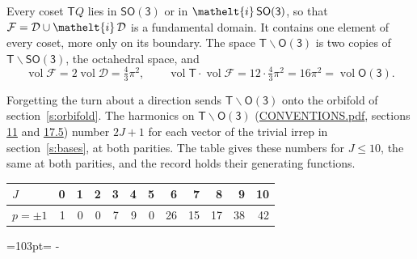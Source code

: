 \documentclass[10pt,a4paper]{article}
\newcommand{\needspace}[1]{\par\penalty-100\begingroup\dimen0=#1\relax\dimen2=\pagegoal
  \advance\dimen2-\pagetotal\ifdim\dimen0>\dimen2\relax\ifdim\dimen2>0pt\vfil\break\fi\fi
  \endgroup}
\numberwithin{equation}{section}
\newcommand{\eltfont}[1]{{\let\sigma\eltsigma\mathelt{#1}}}
\newcommand{\grp}[1]{\mathsf{#1}}
\newcommand{\elt}[1]{\eltfont{#1}}
\newcommand{\vol}{\operatorname{vol}}
\newcommand{\fcell}{\mathcal{D}}
\newcommand{\fdomain}{\mathcal{F}}
\begin{document}
\leavevmode\label{n:set.fundamental}Every coset $\grp{T}Q$ lies in \href{SO3.pdf}{$\grp{SO(3)}$} or in $\elt{i}\,\grp{SO(3)}$, so that $\fdomain = \fcell \cup \elt{i}\,\fcell$ is a fundamental domain. It contains one element of every coset, more only on its boundary.
The space $\grp{T}\backslash\grp{O(3)}$ is two copies of $\grp{T}\backslash\grp{SO(3)}$, the octahedral space, and
\begin{equation}\label{e:volume}\vol\fdomain = 2\vol\fcell = \tfrac{4}{3}\pi^2,\qquad \vol\grp{T}\cdot\vol\fdomain = 12\cdot \tfrac{4}{3}\pi^2 = 16\pi^2 = \vol\grp{O(3)}.\end{equation}

Forgetting the turn about a direction sends $\grp{T}\backslash\grp{O(3)}$ onto the orbifold of section~\ref{s:orbifold}.
The harmonics on $\grp{T}\backslash\grp{O(3)}$ (\href{../../CONVENTIONS.pdf}{CONVENTIONS.pdf}, sections \href{../../CONVENTIONS.pdf\#conv.11}{11} and \href{../../CONVENTIONS.pdf\#conv.17.5}{17.5}) number $2J + 1$ for each vector of the trivial irrep in section~\ref{s:bases}, at both parities. The table gives these numbers for $J \le 10$, the same at both parities, and the record holds their generating functions.
{\small\setlength{\tabcolsep}{4pt}\begin{longtable}{@{}lrrrrrrrrrrr@{}}\toprule
$J$ & 0 & 1 & 2 & 3 & 4 & 5 & 6 & 7 & 8 & 9 & 10\\\midrule\endhead
\bottomrule\endfoot\endlastfoot
$p = \pm 1$ & 1 & 0 & 0 & 7 & 9 & 0 & 26 & 15 & 17 & 38 & 42\\
\bottomrule\end{longtable}}
\needspace{103pt}
\end{document}
